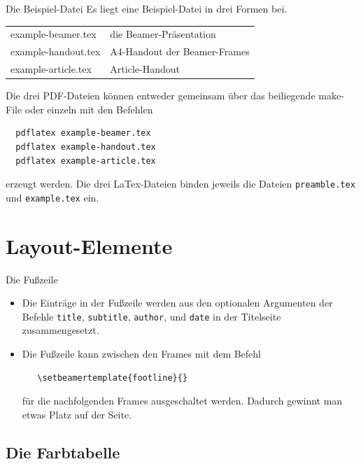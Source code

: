 \begin{frame}[fragile]{Die Beispiel-Datei}
Es liegt eine Beispiel-Datei in drei Formen bei. 
\begin{center}
  \begin{tabular}{lp{6cm}}
    example-beamer.tex &  die Beamer-Präsentation \\
    example-handout.tex & A4-Handout der Beamer-Frames \\
    example-article.tex & Article-Handout \\
  \end{tabular}
\end{center}

Die drei PDF-Dateien können entweder gemeinsam über das beiliegende make-File
oder einzeln mit den Befehlen
\begin{verbatim}
  pdflatex example-beamer.tex
  pdflatex example-handout.tex
  pdflatex example-article.tex
\end{verbatim}
erzeugt werden. Die drei LaTex-Dateien binden jeweils die Dateien
\texttt{preamble.tex} und \texttt{example.tex} ein.

\end{frame}

\section{Layout-Elemente}

\begin{frame}[fragile]{Die Fußzeile}
  \begin{itemize}
  \item Die Einträge in der Fußzeile werden aus den optionalen Argumenten der
  Befehle \texttt{title}, \texttt{subtitle}, \texttt{author},
  \texttt{\institute} und \texttt{date} in der Titelseite
  zusammengesetzt. 

  \item Die Fußzeile kann zwischen den Frames mit dem Befehl
\begin{verbatim}
   \setbeamertemplate{footline}{}
\end{verbatim}
für die nachfolgenden Frames ausgeschaltet werden. Dadurch gewinnt man etwas
Platz auf der Seite.
  \end{itemize}
\end{frame}


\subsection{Die Farbtabelle}

